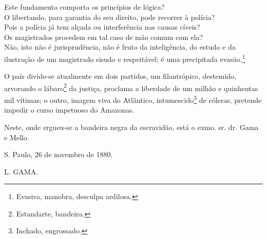 Este fundamento comporta os princípios de lógica?\\
O libertando, para garantia do seu direito, pode recorrer à polícia?\\
Pois a polícia já tem alçada ou interferência nas causas cíveis?\\
Os magistrados procedem em tal caso de mão comum com ela?\\
Não, isto não é jurisprudência, não é fruto da inteligência, do estudo e
da ilustração de um magistrado sisudo e respeitável; é uma precipitada
evasão.\footnote{Evasiva, manobra, desculpa ardilosa.}

O país divide-se atualmente em dois partidos, um filantrópico,
destemido, arvorando o lábaro\footnote{Estandarte, bandeira.} da
justiça, proclama a liberdade de um milhão e quinhentas mil vítimas; o
outro, imagem viva do Atlântico, intumescido\footnote{Inchado,
  engrossado.} de cóleras,
pretende impedir o curso impetuoso do Amazonas.

Neste, onde ergueu-se a bandeira negra da escravidão, está o exmo. sr.
dr. Gama e Mello.

S. Paulo, 26 de novembro de 1880.

L. GAMA.

\pagebreak
\mbox{}\vfill
\thispagestyle{empty}

